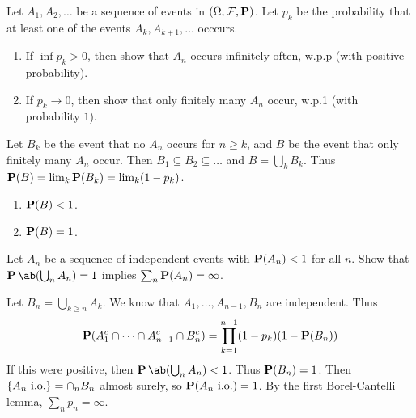 \documentclass[12pt]{article}
\begin{document}
\begin{problem*}
    Let $A_1, A_2, \dots$ be a sequence of events in $(\Omega, \F, \P)$.
    Let $p_k$ be the probability that at least one of the events
    $A_k, A_{k+1}, \dots$ occcurs.
    \begin{enumerate}
        \item If $\inf p_k > 0$, then show that $A_n$ occurs infinitely
        often, w.p.p (with positive probability).
        \item If $p_k \to 0$, then show that only finitely many $A_n$
        occur, w.p.1 (with probability $1$).
    \end{enumerate}
\end{problem*}
\begin{solution} \leavevmode
    Let $B_k$ be the event that no $A_n$ occurs for $n \ge k$,
    and $B$ be the event that only finitely many $A_n$ occur.
    Then $B_1 \subseteq B_2 \subseteq \dots$ and $B = \bigcup_k B_k$.
    Thus $\P(B) = \lim_k \P(B_k) = \lim_k (1 - p_k)$.
    \begin{enumerate}
        \item $\P(B) < 1$.
        \item $\P(B) = 1$. \qedhere
    \end{enumerate}
\end{solution}

\begin{problem*}
    Let $A_n$ be a sequence of independent events with $\P(A_n) < 1$ for all
    $n$.
    Show that $\P\ab(\bigcup_n A_n) = 1$ implies $\sum_n \P(A_n) = \infty$.
\end{problem*}
\begin{solution}
    Let $B_n = \bigcup_{k \ge n} A_k$.
    We know that $A_1, \dots, A_{n-1}, B_n$ are independent.
    Thus \[
        \P(A_1^c \cap \dots \cap A_{n-1}^c \cap B_n^c)
            = \prod_{k=1}^{n-1} (1 - p_k) (1 - \P(B_n))
    \] If this were positive, then $\P\ab(\bigcup_n A_n) < 1$.
    Thus $\P(B_n) = 1$.
    Then $\set{A_n \io} = \cap_n B_n$ almost surely, so $\P(A_n \io) = 1$.
    By the first Borel-Cantelli lemma, $\sum_n p_n = \infty$.
\end{solution}
\end{document}
